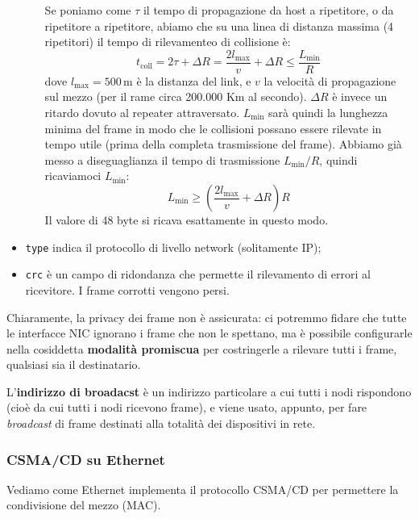 \documentclass[a4paper,11pt]{article}
\begin{document}
\begin{itemize}
\begin{itemize}
Se poniamo come $\tau$ il tempo di propagazione da host a ripetitore, o da ripetitore a ripetitore, abiamo che su una linea di distanza massima (4 ripetitori) il tempo di rilevamenteo di collisione è:
$$
t_\text{coll} = 2 \tau + \Delta R = \frac{2 l_\text{max}}{v} + \Delta R \leq \frac{L_\text{min}}{R}
$$
dove $l_\text{max} = 500 \, \text{m}$ è la distanza del link, e $v$ la velocità di propagazione sul mezzo (per il rame circa 200.000 Km al secondo). $\Delta R$ è invece un ritardo dovuto al repeater attraversato.
$L_\text{min}$ sarà quindi la lunghezza minima del frame in modo che le collisioni possano essere rilevate in tempo utile (prima della completa trasmissione del frame). Abbiamo già messo a diseguaglianza il tempo di trasmissione $L_\text{min} / R$, quindi ricaviamoci $L_\text{min}$:
$$
L_\text{min} \geq \left( \frac{2 l_\text{max}}{v} + \Delta R \right) R
$$
Il valore di 48 byte si ricava esattamente in questo modo.

		\end{itemize}

	\item \lstinline|type| indica il protocollo di livello network (solitamente IP);
	\item \lstinline|crc| è un campo di ridondanza che permette il rilevamento di errori al ricevitore. I frame corrotti vengono persi.
\end{itemize}

Chiaramente, la privacy dei frame non è assicurata: ci potremmo fidare che tutte le interfacce NIC ignorano i frame che non le spettano, ma è possibile configurarle nella cosiddetta \textbf{modalità promiscua} per costringerle a rilevare tutti i frame, qualsiasi sia il destinatario.

L'\textbf{indirizzo di broadacst} è un indirizzo particolare a cui tutti i nodi rispondono (cioè da cui tutti i nodi ricevono frame), e viene usato, appunto, per fare \textit{broadcast} di frame destinati alla totalità dei dispositivi in rete.

\subsubsection{CSMA/CD su Ethernet}
Vediamo come Ethernet implementa il protocollo CSMA/CD per permettere la condivisione del mezzo (MAC).
\end{document}

